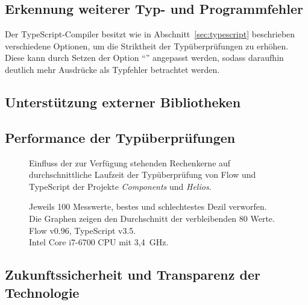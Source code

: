 \subsection{Erkennung weiterer Typ- und Programmfehler}
\label{goal:new-type-errors}

Der TypeScript-Compiler besitzt wie in Abschnitt~\ref{sec:typescript} beschrieben verschiedene Optionen, um die Striktheit der Typüberprüfungen zu erhöhen. Diese kann durch Setzen der Option \enquote{} angepasst werden, sodass daraufhin deutlich mehr Ausdrücke als Typfehler betrachtet werden.


\subsection{Unterstützung externer Bibliotheken}


\subsection{Performance der Typüberprüfungen}


\begin{figure}[tbp]
  \centering

  

  \vspace{.5\baselineskip}

  
  \vspace{.5\baselineskip}
  \caption[Einfluss der zur Verfügung stehenden Rechenkerne auf durchschnittliche Laufzeit der Typüberprüfung von Flow und TypeScript]{
    Einfluss der zur Verfügung stehenden Rechenkerne auf durchschnittliche Laufzeit der Typüberprüfung von Flow und TypeScript der Projekte \textit{Components} und \textit{Helios}.
  }

  \vspace{\baselineskip}
  \caption*{
    \small
    Jeweils 100 Messwerte, bestes und schlechtestes Dezil verworfen.\\
    Die Graphen zeigen den Durchschnitt der verbleibenden 80 Werte.\\
    Flow v0.96, TypeScript v3.5.\\
    Intel Core i7-6700 CPU mit 3,4~GHz.
  }
\end{figure}


\subsection{Zukunftssicherheit und Transparenz der Technologie}

